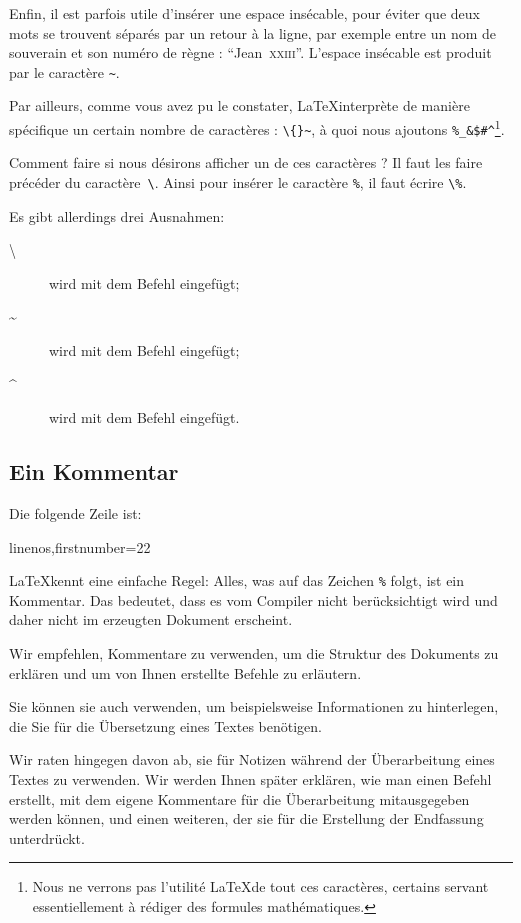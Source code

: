 Enfin, il est parfois utile d'insérer une espace insécable, pour éviter que deux mots se trouvent séparés par un retour à la ligne, par exemple entre un nom de souverain et son numéro de règne : \enquote{Jean~\textsc{xxiii}}.  L'espace insécable est produit par le caractère \verb|~|.



Par ailleurs, comme vous avez pu le constater, \LaTeX interprète de manière spécifique un certain nombre de caractères : \verb|\{}~|, à quoi nous ajoutons \verb|%_&$#^|\footnote{Nous ne verrons pas l'utilité \LaTeX  de tout ces caractères, certains servant essentiellement à rédiger des formules mathématiques.}.

Comment faire si nous désirons afficher un de ces caractères ? Il faut les faire précéder du caractère~\verb|\|. Ainsi pour insérer le caractère \verb|%|, il faut écrire \verb|\%|. 

Es gibt allerdings drei Ausnahmen:
\begin{description}
\item[\textbackslash] wird mit dem Befehl  eingefügt;
\item[\textasciitilde] wird mit dem Befehl  eingefügt; 
\item[\textasciicircum] wird mit dem Befehl  eingefügt. 
\end{description}
 
\subsection{Ein Kommentar}

Die folgende Zeile ist: 
\begin{latexcode*}{linenos,firstnumber=22}
\end{latexcode*}

\LaTeX kennt eine einfache Regel: Alles, was auf das Zeichen \verb|%| folgt, ist ein Kommentar.
Das bedeutet, dass es vom Compiler nicht berücksichtigt wird und daher nicht im erzeugten Dokument erscheint. 

Wir empfehlen, Kommentare zu verwenden, um die Struktur des Dokuments zu erklären und um von Ihnen erstellte Befehle zu erläutern.

Sie können sie auch verwenden, um beispielsweise Informationen zu hinterlegen, die Sie für die Übersetzung eines Textes benötigen.

Wir raten hingegen davon ab, sie für Notizen während der Überarbeitung eines Textes zu verwenden. Wir werden Ihnen später erklären, wie man einen Befehl erstellt, mit dem eigene Kommentare für die Überarbeitung mitausgegeben werden können, und einen weiteren, der sie für die Erstellung der Endfassung unterdrückt.



